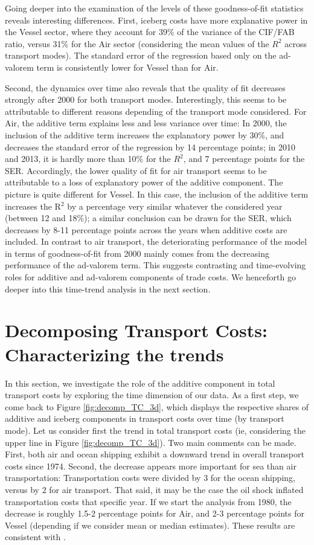 \documentclass[a4paper,11pt]{article}
\begin{document}
Going deeper into the examination of the levels of these goodness-of-fit statistics reveals interesting differences. First, iceberg costs have more explanative power in the Vessel sector, where they account for 39\% of the variance of the CIF/FAB ratio, versus 31\% for the Air sector (considering the mean values of the $R^2$ across transport modes). The standard error of the regression based only on the ad-valorem term is consistently lower for Vessel than for Air.

Second, the dynamics over time also reveals that the quality of fit decreases strongly after 2000 for both transport modes. Interestingly, this seems to be attributable to different reasons depending of the transport mode considered. For Air, the additive term explains less and less variance over time: In 2000, the inclusion of the additive term increases the explanatory power by 30\%, and decreases the standard error of the regression by 14 percentage points;  in 2010 and 2013, it is hardly more than 10\% for the $R^{2}$, and 7 percentage points for the SER. Accordingly, the lower quality of fit for air transport seems to be attributable to a loss of explanatory power of the additive component. The picture is quite different for Vessel. In this case, the inclusion of the additive term increases the R$^{2}$ by a percentage very similar whatever the considered year (between 12 and 18\%); a similar conclusion can be drawn for the SER, which decreases by 8-11 percentage points across the years when additive costs are included. In contrast to air transport, the deteriorating performance of the model in terms of goodness-of-fit from 2000 mainly comes from the decreasing performance of the ad-valorem term. This suggests contrasting and time-evolving roles for additive and ad-valorem components of trade costs. We henceforth go deeper into this time-trend analysis in the next section.\smallskip


\section{Decomposing Transport Costs: Characterizing the trends \label{sec:results_trends}}

In this section, we investigate the role of the additive component in total transport costs by exploring the time dimension of our data. As a first step, we come back to Figure \ref{fig:decomp_TC_3d}, which displays the respective shares of additive and iceberg components in transport costs over time (by transport mode).
Let us consider first the trend in total transport costs (ie, considering the upper line in Figure \ref{fig:decomp_TC_3d}). Two main comments can be made. First, both air and ocean shipping exhibit a downward trend in overall transport costs since 1974. Second, the decrease appears more important for sea than air transportation: Transportation costs were divided by 3 for the ocean shipping, versus by 2 for air transport. That said, it may be the case the oil shock inflated transportation costs that specific year. If we start the analysis from 1980, the decrease is roughly 1.5-2 percentage points for Air, and 2-3 percentage points for Vessel (depending if we consider mean or median estimates). These results are consistent with \citet{hummels2007}.
\end{document}
